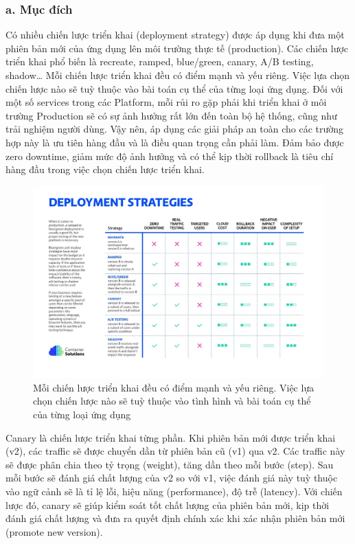 \documentclass[14pt,a4paper]{book}
\begin{document}
{{		\subsubsection{a. Mục đích}
		Có nhiều chiến lược triển khai (deployment strategy) được áp dụng khi đưa một phiên bản mới của ứng dụng lên môi trường thực tế (production). Các chiến lược triển khai phổ biến là recreate, ramped, blue/green, canary, A/B testing, shadow… Mỗi chiến lược triển khai đều có điểm mạnh và yếu riêng. Việc lựa chọn chiến lược nào sẽ tuỳ thuộc vào bài toán cụ thể của từng loại ứng dụng. Đối với một số services trong các Platform, mỗi rủi ro gặp phải khi triển khai ở môi trường Production sẽ có sự ảnh hưởng rất lớn đến toàn bộ hệ thống, cũng như trải nghiệm người dùng. Vậy nên, áp dụng các giải pháp an toàn cho các trường hợp này là ưu tiên hàng đầu và là điều quan trọng cần phải làm. Đảm bảo được zero downtime, giảm mức độ ảnh hưởng và có thể kịp thời rollback là tiêu chí hàng đầu trong việc chọn chiến lược triển khai.
		\begin{figure}[h]
			\centering
			\includegraphics[width=0.7\linewidth]{Pics/3.3.1-1}
			\caption{Mỗi chiến lược triển khai đều có điểm mạnh và yếu riêng. Việc lựa chọn chiến lược nào sẽ tuỳ thuộc vào tình hình và bài toán cụ thể của từng loại ứng dụng}
			\label{fig:3.3-1}
		\end{figure}
		
		Canary là chiến lược triển khai từng phần. Khi phiên bản mới được triển khai (v2), các traffic sẽ được chuyển dần từ phiên bản cũ (v1) qua v2. Các traffic này sẽ được phân chia theo tỷ trọng (weight), tăng dần theo mỗi bước (step). Sau mỗi bước sẽ đánh giá chất lượng của v2 so với v1, việc đánh giá này tuỳ thuộc vào ngữ cảnh sẽ là tỉ lệ lỗi, hiệu năng (performance), độ trễ (latency). Với chiến lược đó, canary sẽ giúp kiểm soát tốt chất lượng của phiên bản mới, kịp thời đánh giá chất lượng và đưa ra quyết định chính xác khi xác nhận phiên bản mới (promote new version).
		
}}
\end{document}
